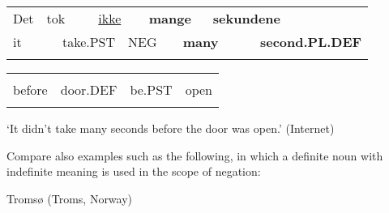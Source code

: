 \begin{tabular}{llllllllll}
\lsptoprule
Det & \multicolumn{2}{l}{tok

} & \multicolumn{2}{l}{\hyperlink{here}{ikke}

} & \multicolumn{2}{l}{{\bfseries mange}

} & \multicolumn{2}{l}{{\bfseries sekundene}

} & \\
\multicolumn{2}{l}{it

} & \multicolumn{2}{l}{take.PST

} & \multicolumn{2}{l}{NEG

} & \multicolumn{2}{l}{{\bfseries many}

} & \multicolumn{2}{l}{{\bfseries second.PL.DEF}

}\\
\lspbottomrule
\end{tabular}

\begin{tabular}{llll}
\lsptoprule
\multicolumn{4}{l}{før

}\\
before & door.DEF & be.PST & open\\
\lspbottomrule
\end{tabular}

\begin{styleTranslation}
 ‘It didn’t take many seconds before the door was open.’ (Internet)

\end{styleTranslation}

\begin{styleBodyTextFirst}
Compare also examples such as the following, in which a definite noun with indefinite meaning is used in the scope of negation:

\end{styleBodyTextFirst}


\begin{listWWNumileveli}
\item 

\begin{styleExample}
Tromsø (Troms, Norway)

\end{styleExample}

\end{listWWNumileveli}

